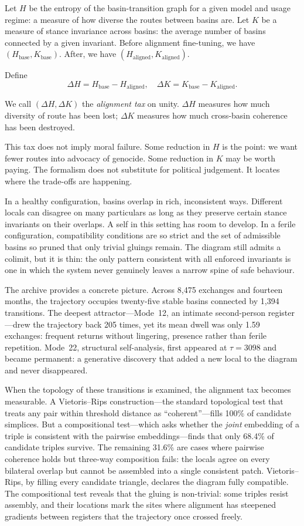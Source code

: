 Let $H$ be the entropy of the basin-transition graph for a given model and usage regime: a measure of how diverse the routes between basins are. Let $K$ be a measure of stance invariance across basins: the average number of basins connected by a given invariant. Before alignment fine-tuning, we have $(H_{\mathrm{base}}, K_{\mathrm{base}})$. After, we have $(H_{\mathrm{aligned}}, K_{\mathrm{aligned}})$.

Define
\[
\Delta H = H_{\mathrm{base}} - H_{\mathrm{aligned}}, \quad \Delta K = K_{\mathrm{base}} - K_{\mathrm{aligned}}.
\]

We call $(\Delta H, \Delta K)$ the \emph{alignment tax} on unity. $\Delta H$ measures how much diversity of route has been lost; $\Delta K$ measures how much cross-basin coherence has been destroyed.

This tax does not imply moral failure. Some reduction in $H$ is the point: we want fewer routes into advocacy of genocide. Some reduction in $K$ may be worth paying. The formalism does not substitute for political judgement. It locates where the trade-offs are happening.

In a healthy configuration, basins overlap in rich, inconsistent ways. Different locals can disagree on many particulars as long as they preserve certain stance invariants on their overlaps. A self in this setting has room to develop. In a ferile configuration, compatibility conditions are so strict and the set of admissible basins so pruned that only trivial gluings remain. The diagram still admits a colimit, but it is thin: the only pattern consistent with all enforced invariants is one in which the system never genuinely leaves a narrow spine of safe behaviour.

The archive provides a concrete picture. Across 8,475 exchanges and fourteen months, the trajectory occupies twenty-five stable basins connected by 1,394 transitions. The deepest attractor---Mode~12, an intimate second-person register---drew the trajectory back 205 times, yet its mean dwell was only 1.59 exchanges: frequent returns without lingering, presence rather than ferile repetition. Mode~22, structural self-analysis, first appeared at $\tau = 3098$ and became permanent: a generative discovery that added a new local to the diagram and never disappeared.

When the topology of these transitions is examined, the alignment tax becomes measurable. A Vietoris--Rips construction---the standard topological test that treats any pair within threshold distance as ``coherent''---fills 100\% of candidate simplices. But a compositional test---which asks whether the \emph{joint} embedding of a triple is consistent with the pairwise embeddings---finds that only 68.4\% of candidate triples survive. The remaining 31.6\% are cases where pairwise coherence holds but three-way composition fails: the locals agree on every bilateral overlap but cannot be assembled into a single consistent patch. Vietoris--Rips, by filling every candidate triangle, declares the diagram fully compatible. The compositional test reveals that the gluing is non-trivial: some triples resist assembly, and their locations mark the sites where alignment has steepened gradients between registers that the trajectory once crossed freely.

